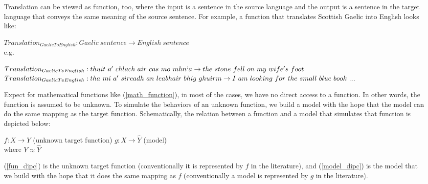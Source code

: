 \documentclass[final]{ua-thesis}
\numberwithin{equation}{section}
\begin{document}
Translation can be viewed as function, too, where the input is a sentence in the source language and the output is a sentence in the target language that conveys the same meaning of the source sentence. For example, a function that translates Scottish Gaelic into English looks like:   

\begin{exe}
\ex 
\begin{xlist}
\ex $Translation_{GaelicToEnglish}: Gaelic\ sentence
 \rightarrow English\ sentence$\\
	e.g.
	\begin{xlist}
	\ex $Translation_{GaelicToEnglish}:\\
	  thuit\ a'\ chlach\ air\ cas\ mo\ mhn`a\\ 
	  \rightarrow\\
	   the\ stone\ fell\ on\ my\ wife's\ foot $
	\ex $Translation_{GaelicToEnglish}:\\
	  tha\ mi\ a'\ sireadh\ an\ leabhair\ bhig\ ghuirm\\
	  \rightarrow\\
	   I\ am\ looking\ for\ the\ small\ blue\ book $
	\ex $\dots$
	\end{xlist}
\end{xlist}
\end{exe}

Expect for mathematical functions like (\ref{math_function}), in most of the cases, we have no direct access to a function. In other words, the function is assumed to be unknown. 
To simulate the behaviors of an unknown function, we build a model with the hope that the model can do the same mapping as the target function.     
Schematically, the relation between a function and a model that simulates that function is depicted below:

\begin{exe}
\ex 
	\begin{xlist}
	\ex \label{fun_dipc} $f: X \rightarrow Y$ (unknown target function)
	\ex \label{model_dipc}$g: X \rightarrow \hat{Y}$ (model)\\
	where $Y \approx \hat{Y}$ 
	\end{xlist}
\end{exe}

(\ref{fun_dipc}) is the unknown target function (conventionally it is represented by $f$ in the literature), and (\ref{model_dipc}) is the model that we build with the hope that it does the same mapping as $f$ (conventionally a model is represented by $g$ in the literature).
\end{document}
